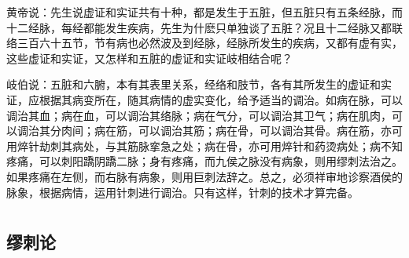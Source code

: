 \documentclass[a4paper,12pt,UTF8,twoside]{ctexbook}
\begin{document}
黄帝说：先生说虚证和实证共有十种，都是发生于五脏，但五脏只有五条经脉，而十二经脉，每经都能发生疾病，先生为什麽只单独谈了五脏？况且十二经脉又都联络三百六十五节，节有病也必然波及到经脉，经脉所发生的疾病，又都有虚有实，这些虚证和实证，又怎样和五脏的虚证和实证岐相结合呢？

岐伯说：五脏和六腑，本有其表里关系，经络和肢节，各有其所发生的虚证和实证，应根据其病变所在，随其病情的虚实变化，给予适当的调治。如病在脉，可以调治其血；病在血，可以调治其络脉；病在气分，可以调治其卫气；病在肌肉，可以调治其分肉间；病在筋，可以调治其筋；病在骨，可以调治其骨。病在筋，亦可用焠针劫刺其病处，与其筋脉挛急之处；病在骨，亦可用焠针和药烫病处；病不知疼痛，可以刺阳蹻阴蹻二脉；身有疼痛，而九侯之脉没有病象，则用缪刺法治之。如果疼痛在左侧，而右脉有病象，则用巨刺法辞之。总之，必须祥审地诊察酒侯的脉象，根据病情，运用针刺进行调治。只有这样，针刺的技术才算完备。

\part{}

\chapter{缪刺论}
\end{document}
